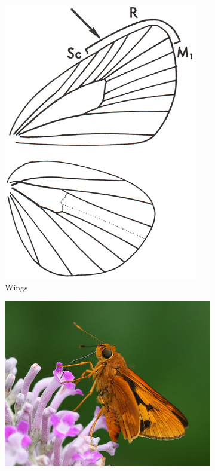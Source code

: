 \documentclass[letterpaper, 11pt]{article}
\begin{document}
\begin{figure}[ht!]
    \centering
    \begin{subfigure}[ht!]{0.31\textwidth}
        \includegraphics[width=\textwidth]{image25}
        \caption{Wings}
        \label{fig:hesperiid1}
    \end{subfigure}
    \qquad %
    \begin{subfigure}[ht!]{0.5\textwidth}
        \includegraphics[width=\textwidth]{image24}

\end{subfigure}
\end{figure}
\end{document}
